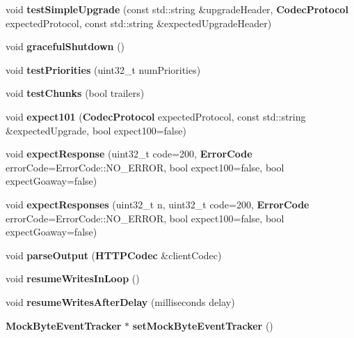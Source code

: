 \begin{DoxyCompactItemize}
\item 
void {\bf test\+Simple\+Upgrade} (const std\+::string \&upgrade\+Header, {\bf Codec\+Protocol} expected\+Protocol, const std\+::string \&expected\+Upgrade\+Header)
\item 
void {\bf graceful\+Shutdown} ()
\item 
void {\bf test\+Priorities} (uint32\+\_\+t num\+Priorities)
\item 
void {\bf test\+Chunks} (bool trailers)
\item 
void {\bf expect101} ({\bf Codec\+Protocol} expected\+Protocol, const std\+::string \&expected\+Upgrade, bool expect100=false)
\item 
void {\bf expect\+Response} (uint32\+\_\+t code=200, {\bf Error\+Code} error\+Code=Error\+Code\+::\+N\+O\+\_\+\+E\+R\+R\+OR, bool expect100=false, bool expect\+Goaway=false)
\item 
void {\bf expect\+Responses} (uint32\+\_\+t n, uint32\+\_\+t code=200, {\bf Error\+Code} error\+Code=Error\+Code\+::\+N\+O\+\_\+\+E\+R\+R\+OR, bool expect100=false, bool expect\+Goaway=false)
\item 
void {\bf parse\+Output} ({\bf H\+T\+T\+P\+Codec} \&client\+Codec)
\item 
void {\bf resume\+Writes\+In\+Loop} ()
\item 
void {\bf resume\+Writes\+After\+Delay} (milliseconds delay)
\item 
{\bf Mock\+Byte\+Event\+Tracker} $\ast$ {\bf set\+Mock\+Byte\+Event\+Tracker} ()
\end{DoxyCompactItemize}
